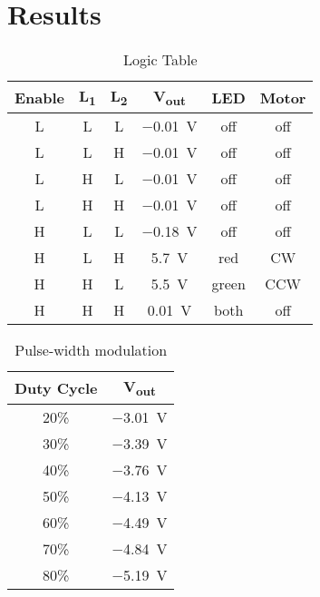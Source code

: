 \section{Results}
\label{sec:results}

\begin{table}[hbtp]
  \centering
  \begin{tabular}{ccc|ccc}
    Enable & \si{L_1} & \si{L_2} & \si{V_{out}} & LED & Motor \\
    \hline
    L & L & L & \SI{-0.01}{V} & off & off \\
    L & L & H & \SI{-0.01}{V} & off & off \\
    L & H & L & \SI{-0.01}{V} & off & off \\
    L & H & H & \SI{-0.01}{V} & off & off \\
    H & L & L & \SI{-0.18}{V} & off & off \\
    H & L & H & \SI{+5.7}{V} & red & CW \\
    H & H & L & \SI{+5.5}{V} & green & CCW \\
    H & H & H & \SI{+0.01}{V} & both & off \\
  \end{tabular}
  \caption{\label{tab:logic} Logic Table}
\end{table}

\begin{table}[hbtp]
  \centering
  \begin{tabular}{cc}
    Duty Cycle & \si{V_{out}} \\
    \hline
    20\% & \SI{-3.01}{V} \\
    30\% & \SI{-3.39}{V} \\
    40\% & \SI{-3.76}{V} \\
    50\% & \SI{-4.13}{V} \\
    60\% & \SI{-4.49}{V} \\
    70\% & \SI{-4.84}{V} \\
    80\% & \SI{-5.19}{V} \\
  \end{tabular}
  \caption{\label{tab:duty} Pulse-width modulation}
\end{table}



